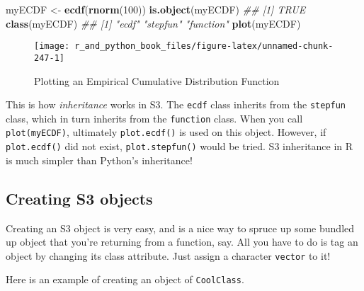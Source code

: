 \documentclass[12pt,krantz2]{krantz}
\makeatletter
\newenvironment{Shaded}{\begin{snugshade}}{\end{snugshade}}
\newcommand{\CommentTok}[1]{\textcolor[rgb]{0.37,0.37,0.37}{\textit{#1}}}
\newcommand{\DecValTok}[1]{\textcolor[rgb]{0.06,0.06,0.06}{#1}}
\newcommand{\KeywordTok}[1]{\textcolor[rgb]{0.27,0.27,0.27}{\textbf{#1}}}
\newcommand{\NormalTok}[1]{#1}
\newcommand{\OperatorTok}[1]{\textcolor[rgb]{0.43,0.43,0.43}{\textbf{#1}}}
\newcommand{\StringTok}[1]{\textcolor[rgb]{0.5,0.5,0.5}{#1}}
\newenvironment{kframe}{%
\medskip{}
\setlength{\fboxsep}{.8em}
 \def\at@end@of@kframe{}%
 \ifinner\ifhmode%
  \def\at@end@of@kframe{\end{minipage}}%
  \begin{minipage}{\columnwidth}%
 \fi\fi%
 \def\FrameCommand##1{\hskip\@totalleftmargin \hskip-\fboxsep
 \colorbox{shadecolor}{##1}\hskip-\fboxsep
     \hskip-\linewidth \hskip-\@totalleftmargin \hskip\columnwidth}%
 \MakeFramed {\advance\hsize-\width
   \@totalleftmargin\z@ \linewidth\hsize
   \@setminipage}}%
 {\par\unskip\endMakeFramed%
 \at@end@of@kframe}
\renewenvironment{Shaded}{\begin{kframe}}{\end{kframe}}
\makeatother
\begin{document}
\begin{Shaded}
\begin{Highlighting}[]
\NormalTok{myECDF <-}\StringTok{ }\KeywordTok{ecdf}\NormalTok{(}\KeywordTok{rnorm}\NormalTok{(}\DecValTok{100}\NormalTok{))}
\KeywordTok{is.object}\NormalTok{(myECDF)}
\CommentTok{## [1] TRUE}
\KeywordTok{class}\NormalTok{(myECDF)}
\CommentTok{## [1] "ecdf"     "stepfun"  "function"}
\KeywordTok{plot}\NormalTok{(myECDF)}
\end{Highlighting}
\end{Shaded}

\begin{figure}

{\centering \texttt{[image: r\_and\_python\_book\_files/figure-latex/unnamed-chunk-247-1]} 

}

\caption{Plotting an Empirical Cumulative Distribution Function}\label{fig:unnamed-chunk-247}
\end{figure}

This is how \emph{inheritance} works in S3. The \texttt{ecdf} class inherits from the \texttt{stepfun} class, which in turn inherits from the \texttt{function} class. When you call \texttt{plot(myECDF)}, ultimately \texttt{plot.ecdf()} is used on this object. However, if \texttt{plot.ecdf()} did not exist, \texttt{plot.stepfun()} would be tried. S3 inheritance in R is much simpler than Python's inheritance!

\hypertarget{creating-s3-objects}{%
\subsection{Creating S3 objects}\label{creating-s3-objects}}

Creating an S3 object is very easy, and is a nice way to spruce up some bundled up object that you're returning from a function, say. All you have to do is tag an object by changing its class attribute. Just assign a character \texttt{vector} to it!

Here is an example of creating an object of \texttt{CoolClass}.

\begin{Shaded}
\end{Shaded}
\end{document}
